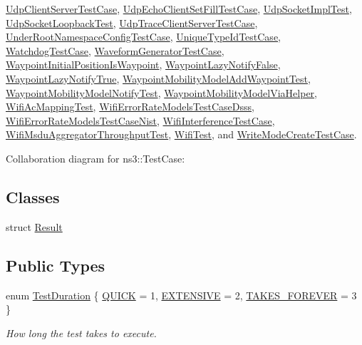 \hyperlink{classUdpClientServerTestCase}{Udp\+Client\+Server\+Test\+Case}, \hyperlink{classUdpEchoClientSetFillTestCase}{Udp\+Echo\+Client\+Set\+Fill\+Test\+Case}, \hyperlink{classUdpSocketImplTest}{Udp\+Socket\+Impl\+Test}, \hyperlink{classUdpSocketLoopbackTest}{Udp\+Socket\+Loopback\+Test}, \hyperlink{classUdpTraceClientServerTestCase}{Udp\+Trace\+Client\+Server\+Test\+Case}, \hyperlink{classUnderRootNamespaceConfigTestCase}{Under\+Root\+Namespace\+Config\+Test\+Case}, \hyperlink{classUniqueTypeIdTestCase}{Unique\+Type\+Id\+Test\+Case}, \hyperlink{classWatchdogTestCase}{Watchdog\+Test\+Case}, \hyperlink{classWaveformGeneratorTestCase}{Waveform\+Generator\+Test\+Case}, \hyperlink{classWaypointInitialPositionIsWaypoint}{Waypoint\+Initial\+Position\+Is\+Waypoint}, \hyperlink{classWaypointLazyNotifyFalse}{Waypoint\+Lazy\+Notify\+False}, \hyperlink{classWaypointLazyNotifyTrue}{Waypoint\+Lazy\+Notify\+True}, \hyperlink{classWaypointMobilityModelAddWaypointTest}{Waypoint\+Mobility\+Model\+Add\+Waypoint\+Test}, \hyperlink{classWaypointMobilityModelNotifyTest}{Waypoint\+Mobility\+Model\+Notify\+Test}, \hyperlink{classWaypointMobilityModelViaHelper}{Waypoint\+Mobility\+Model\+Via\+Helper}, \hyperlink{classWifiAcMappingTest}{Wifi\+Ac\+Mapping\+Test}, \hyperlink{classWifiErrorRateModelsTestCaseDsss}{Wifi\+Error\+Rate\+Models\+Test\+Case\+Dsss}, \hyperlink{classWifiErrorRateModelsTestCaseNist}{Wifi\+Error\+Rate\+Models\+Test\+Case\+Nist}, \hyperlink{classWifiInterferenceTestCase}{Wifi\+Interference\+Test\+Case}, \hyperlink{classWifiMsduAggregatorThroughputTest}{Wifi\+Msdu\+Aggregator\+Throughput\+Test}, \hyperlink{classWifiTest}{Wifi\+Test}, and \hyperlink{classWriteModeCreateTestCase}{Write\+Mode\+Create\+Test\+Case}.



Collaboration diagram for ns3\+:\+:Test\+Case\+:
\subsection*{Classes}
\begin{DoxyCompactItemize}
\item 
struct \hyperlink{structns3_1_1TestCase_1_1Result}{Result}
\end{DoxyCompactItemize}
\subsection*{Public Types}
\begin{DoxyCompactItemize}
\item 
enum \hyperlink{classns3_1_1TestCase_a11f6f57c21a0d32e605d192a89550f91}{Test\+Duration} \{ \hyperlink{classns3_1_1TestCase_a11f6f57c21a0d32e605d192a89550f91ac2f47fb646e77f4ce7d662a69120965f}{Q\+U\+I\+CK} = 1, 
\hyperlink{classns3_1_1TestCase_a11f6f57c21a0d32e605d192a89550f91a52858a023576ded5148030f08c1c2419}{E\+X\+T\+E\+N\+S\+I\+VE} = 2, 
\hyperlink{classns3_1_1TestCase_a11f6f57c21a0d32e605d192a89550f91a88f5459fbc31d63d7cadbbf69e604898}{T\+A\+K\+E\+S\+\_\+\+F\+O\+R\+E\+V\+ER} = 3
 \}\begin{DoxyCompactList}\small\item\em How long the test takes to execute. \end{DoxyCompactList}
\end{DoxyCompactItemize}
